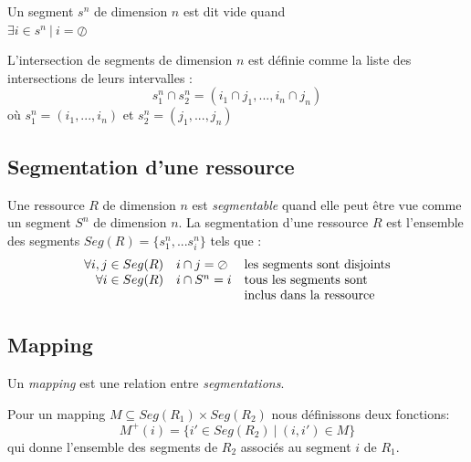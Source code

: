 \documentclass{article}
\newcommand{\emptyseg}		{\ensuremath{\oslash}}
\newcommand{\seg}[1]			{Seg(#1)}
\begin{document}
Un segment $s^n$ de dimension $n$ est dit vide quand\\ $\exists i \in s^n\ |\ i = \emptyseg $

L'intersection de segments de dimension $n$ est définie comme la liste des intersections de leurs intervalles :
\begin{equation}
s_1^n \cap s_2^n = (i_1 \cap j_1, ... , i_n \cap j_n)
\end{equation}
où $s_1^n = (i_1, ... , i_n)$ et  $s_2^n = (j_1, ... , j_n)$


\subsection{Segmentation d'une ressource}
\label{segmentation}

Une ressource $R$ de dimension $n$ est \emph{segmentable} quand elle peut être vue comme un segment $S^n$ de dimension $n$.
La segmentation d'une ressource $R$ est l'ensemble des segments
$\seg{R}=\{ s_1^n, ... s_i^n\}$ tels que : \\
\begin{displaymath}
\begin{array}{rll}
\forall i, j \in \seg{R} & i \cap j =  \emptyseg  & $les segments sont disjoints$ \\
\forall i \in \seg{R} & i \cap S^n = i & $tous les segments sont $ \\
	& & $inclus dans la ressource$ \\
\end{array}
\end{displaymath}


\subsection{Mapping}
\label{resmap}

Un \emph{mapping} est une relation entre \emph{segmentations}.

Pour un mapping $M\subseteq \seg{R_{1}}\times \seg{R_{2}}$ nous définissons deux fonctions:
\begin{equation}
	M^{+}(i)=\{ i'\in \seg{R_{2}}\ |\ (i,i')\in M\}
\end{equation}
qui donne l'ensemble des segments de $R_{2}$ associés au segment
$i$ de $R_{1}$. 
\end{document}

